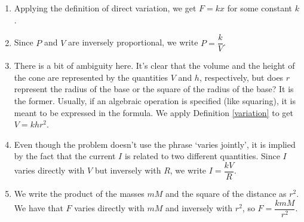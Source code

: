 {
\begin{enumerate}

\item Applying the definition of direct variation, we get  $F = k x$ for some constant $k$.

\item Since $P$ and $V$ are inversely proportional, we write $P = \dfrac{k}{V}$.

\item  There is a bit of ambiguity here.  It's clear that the volume and the height of the cone are represented by the quantities $V$ and $h$, respectively, but does $r$ represent the radius of the base or the square of the radius of the base?  It is the former.  Usually, if an algebraic operation is specified (like squaring), it is meant to be expressed in the formula.  We apply Definition \ref{variation} to get $V = k h r^{2}$.  

\item  Even though the problem doesn't use the phrase `varies jointly', it is implied by the fact that the current $I$ is related to two different quantities.  Since $I$ varies directly with $V$ but inversely with $R$, we write $I = \dfrac{k V}{R}$.

\item We write the product of the masses $mM$ and the square of the distance as $r^2$.  We have that $F$ varies directly with $mM$ and inversely with $r^2$, so $F = \dfrac{kmM}{r^2}$.  

\end{enumerate}
}

\medskip




